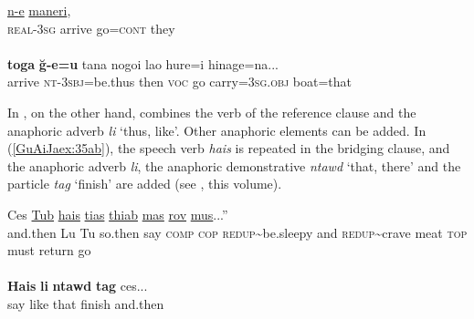 \documentclass[output=paper]{LSP/langsci}
\begin{document}
\begin{exe}
\ex \label{GuAiex:34ab}
\begin{xlist}
\ex \label{GuAiex:34a}
\gll \underline{n-e}     \underline{}   \underline{}     \underline{maneri},\\
  \textsc{real-3sg} arrive   go=\textsc{cont} they \\
\glt {} \\
\ex \label{GuAiex:34b}
\gll  \textbf{toga}  \textbf{ğ-e=u}                tana   nogoi        lao   hure=i           hinage=na...\\
arrive            \textsc{nt-3sbj}=be.thus   then   \textsc{voc} go   carry=\textsc{3sg.obj}   boat=that\\
\glt {}
\end{xlist}
\end{exe}


In , on the other hand,  combines the verb of the reference clause and the anaphoric adverb \textit{li} `thus, like'. Other anaphoric elements can be added. In (\ref{GuAiJaex:35ab}), the speech verb \textit{hais} is repeated in the bridging clause, and the anaphoric adverb \textit{li}, the anaphoric demonstrative \textit{ntawd} `that, there' and the particle \textit{tag} `finish' are added (see \citeauthor{jarkey18}, this volume).


\begin{exe}
\ex \label{GuAiJaex:35ab}
\begin{xlist}
\ex \label{GuAiJaex:35a}
\gll Ces \underline{} \underline{Tub} \underline{} \underline{hais} \underline{tias} \underline{}     \underline{} \underline{thiab} \underline{} \underline{} \underline{mas} \underline{} \underline{rov} \underline{mus}...'' \\
 and.then Lu Tu so.then say \textsc{comp} \textsc{cop} \textsc{redup}{\textasciitilde}be.sleepy and \textsc{redup}{\textasciitilde}crave  meat \textsc{top} must return go\\
\glt {}\\
\ex \label{GuAiJaex:35b}
\gll \textbf{Hais} \textbf{li}  \textbf{ntawd} \textbf{tag} ces... \\     	      
     say like that  finish  and.then\\
\glt {} 
\end{xlist}
\end{exe}
\end{document}
